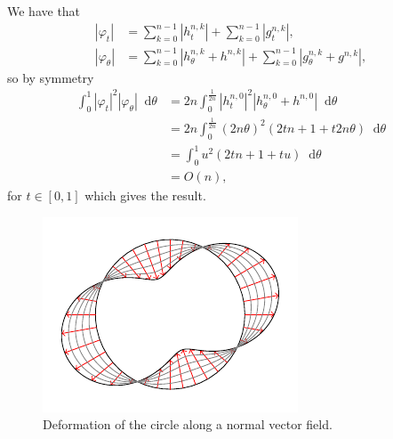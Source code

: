 \documentclass[a4,danish]{article}
\theoremstyle{break}
\theoremstyle{definition}
\theoremstyle{Break}
\renewcommand{\phi}{\varphi}
\newcommand*\diff{\mathop{}\!\mathrm{d}}
\begin{document}
We have that
\begin{equation*}
  \begin{aligned}
    |\phi_t| & = \sum_{k=0}^{n-1} |h^{n,k}_t| + \sum_{k=0}^{n-1}
    |g^{n,k}_t|, \\
    |\phi_{\theta}| & = \sum_{k=0}^{n-1} |h^{n,k}_{\theta} + h^{n,k} | +
    \sum_{k=0}^{n-1}
    |g^{n,k}_{\theta} + g^{n,k} |,
  \end{aligned}
\end{equation*}
so by symmetry
\begin{equation*}
  \begin{aligned}
    \int_{0}^{1}
    |\phi_t|^2   |\phi_{\theta}|
    \diff \theta
    & =
    2n \int_{0}^{\frac{1}{2n}} |h^{n,0}_t|^2 |h^{n,0}_{\theta} + h^{n,0} |
    \diff \theta \\
    & = 2n \int_{0}^{\frac{1}{2n}}
    (2n\theta)^2(2tn+1+t2n\theta) \diff \theta \\
    & = \int_{0}^1
    u^2(2tn+1+t u) \diff \theta \\
    & = O(n),
  \end{aligned}
\end{equation*}
for $t\in[0,1]$ which gives the result.

\begin{figure}
  \centerline{\includegraphics[width=1\linewidth]{deform_circle.pdf}}
  \caption{Deformation of the circle along a normal vector
    field.}
  \label{fig:deform-circle}
\end{figure}
\end{document}
